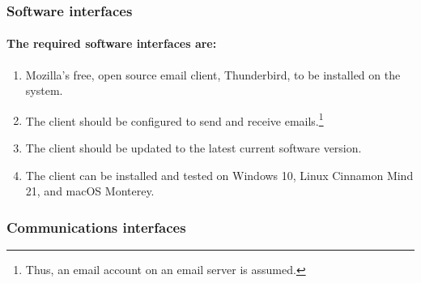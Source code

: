 \subsubsection{Software interfaces}
%
%

\paragraph{The required software interfaces are:}
\begin{enumerate}
\item Mozilla's free, open source email client, Thunderbird, to be installed on the system.
\item The client should be configured to send and receive emails.\footnote{Thus, an email account on an email server is assumed.}
\item The client should be updated to the latest current software version.
\item The client can be installed and tested on Windows 10, Linux Cinnamon Mind 21, and macOS Monterey.
\end{enumerate}



\subsubsection{Communications interfaces}

